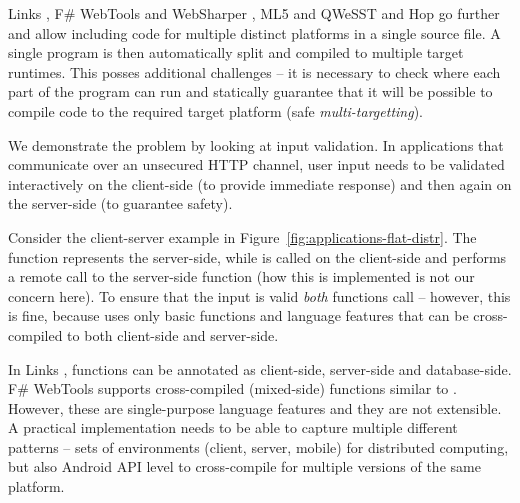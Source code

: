 Links \cite{app-distributed-links}, F\# WebTools and WebSharper \cite{app-fsharp-webapps,app-fsharp-webtools},
ML5 and QWeSST \cite{app-distributed-ml5, app-distributed-qwesst} and Hop \cite{app-hop-lang} go 
further and allow including code for multiple distinct platforms in a single source file. 
A single program is then automatically split and compiled to multiple target runtimes. This
posses additional challenges -- it is necessary to check where each part of the program can run
and statically guarantee that it will be possible to compile code to the required target 
platform (safe \emph{multi-targetting}).

We demonstrate the problem by looking at input validation. In applications that communicate over 
an unsecured HTTP channel, user input needs to be validated interactively on the client-side (to 
provide immediate response) and then again on the server-side (to guarantee safety). 

Consider the client-server example in Figure~\ref{fig:applications-flat-distr}. The 
 function represents the server-side, while  is called 
on the client-side and performs a remote call to the server-side function (how this is implemented 
is not our concern here). To ensure that the input is valid \emph{both} functions call 
 -- however, this is fine, because  uses only basic
functions and language features that can be cross-compiled to both client-side and server-side.

In Links \cite{app-distributed-links}, functions can be annotated as client-side, server-side
and database-side. F\# WebTools \cite{app-fsharp-webtools} supports cross-compiled (mixed-side)
functions similar to . However, these are single-purpose language features 
and they are not extensible. A practical implementation needs to be able to capture multiple
different patterns -- sets of environments (client, server, mobile) for distributed computing,
but also Android API level \cite{app-android-multitarget} to cross-compile for multiple versions 
of the same platform.


